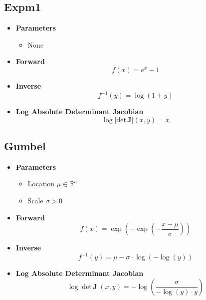 \documentclass{article}
\begin{document}
\subsection{Expm1}
\begin{itemize}
  \item \textbf{Parameters}
  \begin{itemize}
    \item None
  \end{itemize}
  \item \textbf{Forward}
  \begin{equation}
    f(x) = e^x - 1
  \end{equation}
  \item \textbf{Inverse}
  \begin{equation}
    f^{-1}(y) = \log ( 1 + y )
  \end{equation}
  \item \textbf{Log Absolute Determinant Jacobian}
  \begin{equation}
    \log \vert \text{det} \, \mathbf{J} \vert (x, y) = x
  \end{equation}
\end{itemize}
\subsection{Gumbel}
\begin{itemize}
  \item \textbf{Parameters}
  \begin{itemize}
    \item Location $\mu \in \mathbb{R}^n$
    \item Scale $\sigma > 0$
  \end{itemize}
  \item \textbf{Forward}
  \begin{equation}
    f(x) = \exp \left( - \exp \left( - \frac{x - \mu}{\sigma} \right) \right)
  \end{equation}
  \item \textbf{Inverse}
  \begin{equation}
    f^{-1}(y) = \mu - \sigma \cdot \log \left( - \log \left( y \right) \right)
  \end{equation}
  \item \textbf{Log Absolute Determinant Jacobian}
  \begin{equation}
    \log \vert \text{det} \, \mathbf{J} \vert (x, y) = - \log \left( \frac{\sigma}{-\log(y) \cdot y} \right)
  \end{equation}
\end{itemize}
\end{document}
